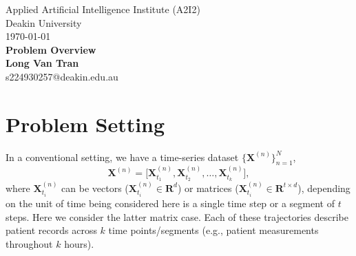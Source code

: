 \documentclass[a4paper, 11pt]{article}
\begin{document}
\begin{sloppypar}
\begin{center}
Applied Artificial Intelligence Institute (A2I2)\\
Deakin University\\
\today\\[24pt]
\LARGE
\textbf{Problem Overview}\\[6pt]
\small
\textbf {Long Van Tran}\\[6pt]
s224930257@deakin.edu.au\\[6pt]
\end{center}





\section{Problem Setting}\label{s:1}
In a conventional setting, we have a time-series dataset $\{\mathbf{X}^{(n)}\}_{n=1}^N$,
\[
\mathbf{X}^{(n)} 
= 
\bigl[\mathbf{X}_{t_{1}}^{(n)}, \mathbf{X}_{t_{2}}^{(n)}, \ldots, \mathbf{X}_{t_{k}}^{(n)}\bigr],
\]
where $\mathbf{X}_{t_{i}}^{(n)}$ can be vectors ($\mathbf{X}_{t_{i}}^{(n)} \in \mathbf{R}^d$) or matrices
($\mathbf{X}_{t_{i}}^{(n)} \in \mathbf{R}^{t \times d}$), depending on the unit of time being considered
here is a single time step or a segment of $t$ steps. Here we consider the latter matrix case.
Each of these trajectories describe patient records across \(k\) time points/segments
(e.g., patient measurements throughout \(k\) hours).


\end{sloppypar}
\end{document}
